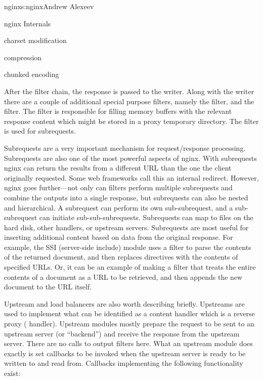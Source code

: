 \begin{aosachapter}{nginx}{s:nginx}{Andrew Alexeev}
\begin{aosasect1}{nginx Internals}
\begin{aosaitemize}
\item charset modification

\item {} compression

\item chunked encoding

\end{aosaitemize}

After the filter chain, the response is passed to the writer. Along
with the writer there are a couple of additional special purpose
filters, namely the  filter, and the 
filter. The  filter is responsible for filling memory
buffers with the relevant response content which might be stored in a
proxy temporary directory. The  filter is used for
subrequests.

Subrequests are a very important mechanism for request/response
processing. Subrequests are also one of the most powerful aspects of
nginx. With subrequests nginx can return the results from a different
URL than the one the client originally requested. Some web frameworks
call this an internal redirect. However, nginx goes further---not only
can filters perform multiple subrequests and combine the outputs into
a single response, but subrequests can also be nested and
hierarchical. A subrequest can perform its own sub-subrequest, and a
sub-subrequest can initiate sub-sub-subrequests. Subrequests can map
to files on the hard disk, other handlers, or upstream
servers. Subrequests are most useful for inserting additional content
based on data from the original response. For example, the SSI
(server-side include) module uses a filter to parse the contents of
the returned document, and then replaces  directives
with the contents of specified URLs. Or, it can be an example of making
a filter that treats the entire contents of a document as a URL to be
retrieved, and then appends the new document to the URL itself.


Upstream and load balancers are also worth describing
briefly. Upstreams are used to implement what can be identified as a
content handler which is a reverse proxy (
handler). %
Upstream modules mostly prepare the request to be sent to an upstream
server (or ``backend'') and receive the response from the upstream
server. There are no calls to output filters here. What an upstream
module does exactly is set callbacks to be invoked when the upstream
server is ready to be written to and read from. Callbacks implementing
the following functionality exist:


\end{aosasect1}
\end{aosachapter}
